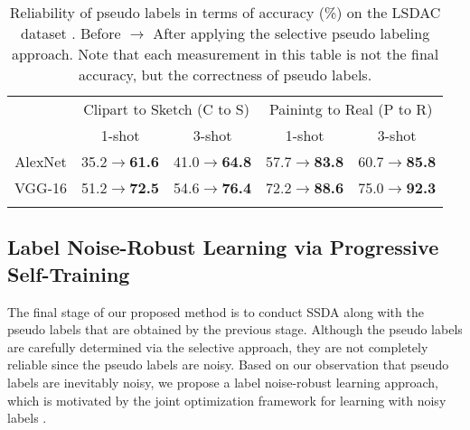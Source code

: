 \documentclass[a4paper,conference]{IEEEtran}
\begin{document}
\begin{table}[!t]
\centering
\caption{Reliability of pseudo labels in terms of accuracy (\%) on the LSDAC dataset \cite{peng2019moment}. Before $\rightarrow$ After applying the selective pseudo labeling approach. Note that each measurement in this table is not the final accuracy, but the correctness of pseudo labels.}
\begin{tabular}{c|c c | c c}
\Xhline{4\arrayrulewidth}
\multirow{2}{*}{Net} & \multicolumn{2}{c|}{Clipart to Sketch (C to S)} & \multicolumn{2}{c}{Painintg to Real (P to R)}\\
& 1-shot & 3-shot & 1-shot & 3-shot\\
\hline
AlexNet & 35.2$\rightarrow$\textbf{61.6} & 41.0$\rightarrow$\textbf{64.8} & 57.7$\rightarrow$\textbf{83.8} & 60.7$\rightarrow$\textbf{85.8}\\
VGG-16 & 51.2$\rightarrow$\textbf{72.5} & 54.6$\rightarrow$\textbf{76.4} & 72.2$\rightarrow$\textbf{88.6} & 75.0$\rightarrow$\textbf{92.3}\\
\Xhline{4\arrayrulewidth}
\end{tabular}
\label{tab:pseudo}
\end{table}









\subsection{Label Noise-Robust Learning via Progressive Self-Training}
\label{sec:2B}
The final stage of our proposed method is to conduct SSDA along with the pseudo labels that are obtained by the previous stage. Although the pseudo labels are carefully determined via the selective approach, they are not completely reliable since the pseudo labels are noisy. Based on our observation that pseudo labels are inevitably noisy, we propose a label noise-robust learning approach, which is motivated by the joint optimization framework for learning with noisy labels \cite{tanaka2018joint}.
\end{document}

